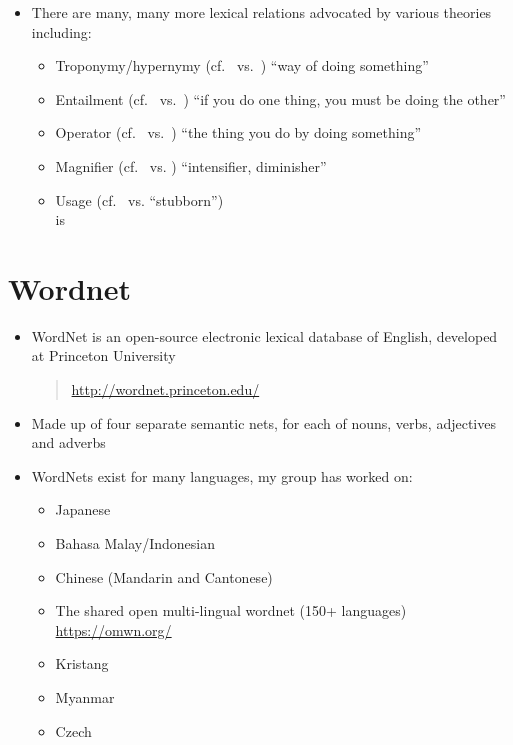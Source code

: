 \documentclass[a4paper,landscape,headrule,footrule,xetex]{foils}
\begin{document}
\MyLogo{}
\begin{itemize}
\item There are many, many more lexical relations advocated by various
  theories including:
  \begin{itemize}
  \item Troponymy/hypernymy (cf.\  vs.\ ) 
    ``way of doing something''
  \item Entailment (cf.\  vs.\ ) ``if you do one thing, you must be doing the other''
  \item Operator (cf.\  vs.\ )
    ``the thing you do by doing something''
  \item Magnifier (cf.\  vs. )
    ``intensifier, diminisher''
  \item Usage (cf.\  vs.  ``stubborn'')
    \\  is 
  \end{itemize}
\end{itemize}


\section{Wordnet}



\begin{itemize}
\item WordNet is an open-source electronic lexical database of English,
  developed at Princeton University
  \begin{quote}
    \url{http://wordnet.princeton.edu/}
  \end{quote}
\item Made up of four separate semantic nets, for each of nouns, verbs,
  adjectives and adverbs
\item WordNets exist for many languages, my group has worked on:
  \begin{itemize}
  \item Japanese 
  \item Bahasa Malay/Indonesian
  \item Chinese (Mandarin and Cantonese)
  \item The shared open multi-lingual wordnet (150+ languages) 
    \\ \url{https://omwn.org/}
  \item Kristang
  \item Myanmar
  \item Czech
\end{itemize}
\end{itemize}
\end{document}
